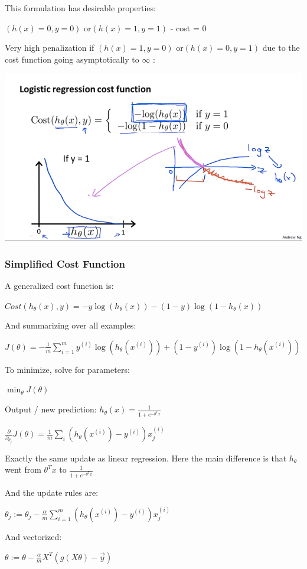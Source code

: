 This formulation has desirable properties: 

$(h(x)=0, y = 0)$ or$(h(x) = 1, y = 1)$  - cost = 0

Very high penalization if $(h(x)=1, y = 0)$ or$(h(x) = 0, y = 1)$ due to the cost function going asymptotically to $\infty$ :

\includegraphics[width=0.8\columnwidth]{ml_figures/cost_function.png}

\subsubsection{Simplified Cost Function}

A generalized cost function is: 

$Cost(h_\theta (x), y) =-y\log(h_\theta(x))-(1-y)\log(1-h_\theta(x))  $

And summarizing over all examples:

$J(\theta)= -\frac{1}{m} \sum_{i=1}^{m} y^{(i)}\log(h_\theta(x^{(i)}))+(1-y^{(i)})\log(1-h_\theta(x^{(i)}))$

To minimize, solve for parameters:

$\min_{\theta} J(\theta) $ 

Output / new prediction: $h_\theta(x) = \frac{1}{1+e^{-\theta^T x}}$

$\frac{\partial}{\partial_{\theta_j}} J(\theta) = \frac 1 m \sum_i (h_\theta(x^{(i)})-y^{(i)})x_j^{(i)}$

Exactly the same update as linear regression. Here the main difference is that $h_\theta$  went from $\theta^T x $ to $\frac{1}{1+e^{-\theta^Tx}}$

And the update rules are:

$\theta_j := \theta_j - \frac{\alpha}{m} \sum_{i=1}^m (h_\theta(x^{(i)}) - y^{(i)}) x_j^{(i)}$

And vectorized:

$\theta:=\theta - \frac{\alpha}{m}X^T(g(X\theta)-\vec{y})$

